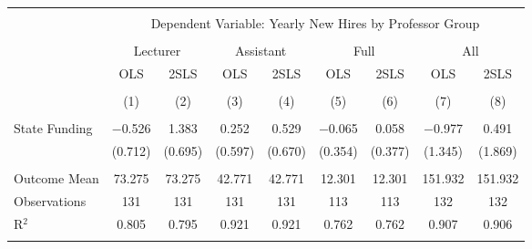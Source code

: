 
\begin{tabular}{@{\extracolsep{5pt}}lcccccccc} 
\\[-1.8ex]\hline 
\hline \\[-1.8ex] 
 & \multicolumn{8}{c}{Dependent Variable: Yearly New Hires by Professor Group} \\ 
\cline{2-9} 
\\[-1.8ex] & \multicolumn{2}{c}{Lecturer} & \multicolumn{2}{c}{Assistant} & \multicolumn{2}{c}{Full} & \multicolumn{2}{c}{All} \\ 
 & OLS & 2SLS & OLS & 2SLS & OLS & 2SLS & OLS & 2SLS \\ 
\\[-1.8ex] & (1) & (2) & (3) & (4) & (5) & (6) & (7) & (8)\\ 
\hline \\[-1.8ex] 
 State Funding & $-$0.526 & 1.383 & 0.252 & 0.529 & $-$0.065 & 0.058 & $-$0.977 & 0.491 \\ 
  & (0.712) & (0.695) & (0.597) & (0.670) & (0.354) & (0.377) & (1.345) & (1.869) \\ 
 \hline \\[-1.8ex] 
Outcome Mean & 73.275 & 73.275 & 42.771 & 42.771 & 12.301 & 12.301 & 151.932 & 151.932 \\ 
Observations & 131 & 131 & 131 & 131 & 113 & 113 & 132 & 132 \\ 
R$^{2}$ & 0.805 & 0.795 & 0.921 & 0.921 & 0.762 & 0.762 & 0.907 & 0.906 \\ 
\hline 
\hline \\[-1.8ex] 
\end{tabular} 
